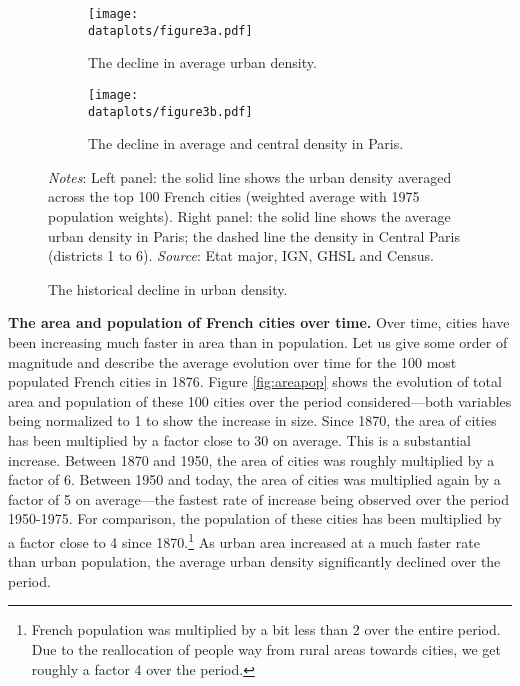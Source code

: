 \documentclass[./20250130-paper.tex]{subfiles}
\begin{document}
\begin{figure}[p]
	\begin{subfigure}{0.5\textwidth}
		\texttt{[image: \\dataplots/figure3a.pdf]}
		\caption{The decline in average urban density.\label{fig:avdensity}
		}
	\end{subfigure}%
	\hspace{5mm}
	\begin{subfigure}{0.5\textwidth}
		\texttt{[image: \\dataplots/figure3b.pdf]}
		\caption{The decline in average and central density in Paris.\label{fig:avdensity-paris}}
	\end{subfigure}
	\caption{The historical decline in urban density.}
	{\footnotesize \textit{Notes}: Left panel: the solid line shows the urban density averaged across the top 100 French cities (weighted average with 1975 population weights). Right panel: the solid line shows the average urban density in Paris; the dashed line the density in Central Paris (districts 1 to 6).
		\textit{Source}: Etat major, IGN, GHSL and Census.}
\end{figure}


\textbf{The area and population of French cities over time.} Over time, cities have been increasing much faster in area than in population. Let us give some order of magnitude and describe the average evolution over time for the 100 most populated French cities in 1876. Figure \ref{fig:areapop} shows the evolution of total area and population of these 100 cities over the period considered---both variables being normalized to 1 to show the increase in size. Since 1870, the area of cities has been multiplied by a factor close to 30 on average. This is a substantial increase. Between 1870 and 1950,  the area of cities was roughly multiplied by a factor of 6. Between 1950 and today, the area of cities was multiplied again by a factor of 5 on average---the fastest rate of increase being observed over the period 1950-1975. For comparison, the population of these cities has been multiplied by a factor close to 4 since 1870.\footnote{French population was multiplied by a bit less than 2 over the entire period. Due to the reallocation of people way from rural areas towards cities, we get roughly a factor 4 over the period.} As urban area increased at a much faster rate than urban population, the average urban density significantly declined over the period.
\end{document}
